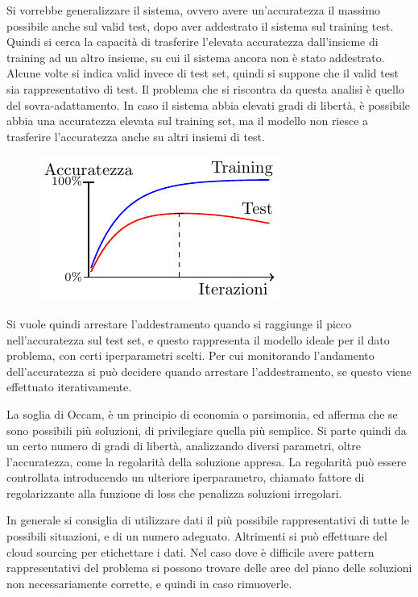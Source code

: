 \documentclass{article}
\numberwithin{equation}{subsection}
\begin{document}
Si vorrebbe generalizzare il sistema, ovvero avere un'accuratezza il massimo possibile 
anche sul valid test, dopo aver addestrato il sistema sul training test. Quindi si cerca la capacità di trasferire l'elevata accuratezza dall'insieme di training ad un altro insieme, su cui il sistema ancora non è stato addestrato. 
Alcune volte si indica valid invece di test set, quindi si suppone che il valid test sia 
rappresentativo di test. Il problema che si riscontra da questa analisi è quello del sovra-adattamento. In caso il sistema abbia elevati gradi di libertà, è possibile abbia una accuratezza elevata sul training set, ma il modello non riesce a trasferire l'accuratezza anche su altri insiemi di test. 

\begin{figure}[H]%
    \centering%
    \includegraphics{overfitting.pdf}%
\end{figure}

Si vuole quindi arrestare l'addestramento quando si raggiunge il picco nell'accuratezza sul test set, e questo rappresenta il modello ideale per il dato problema, con certi iperparametri scelti. Per cui monitorando l'andamento dell'accuratezza si può decidere quando arrestare l'addestramento, se questo viene effettuato iterativamente. 

La soglia di Occam, è un principio di economia o parsimonia, ed afferma che se sono possibili più soluzioni, di privilegiare quella più semplice. 
Si parte quindi da un certo numero di gradi di libertà, analizzando diversi parametri, oltre l'accuratezza, come la regolarità della soluzione appresa. La regolarità può essere controllata introducendo un ulteriore iperparametro, chiamato fattore di regolarizzante alla 
funzione di loss che penalizza soluzioni irregolari. 

In generale si consiglia di utilizzare dati il più possibile rappresentativi di tutte le possibili situazioni, e di un numero adeguato. Altrimenti si può effettuare del cloud sourcing per etichettare i dati. 
Nel caso dove è difficile avere pattern rappresentativi del problema si possono trovare delle aree del piano delle soluzioni non necessariamente corrette, e quindi in caso rimuoverle. 
\end{document}
